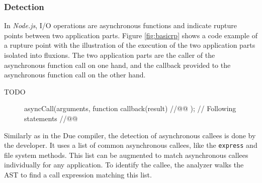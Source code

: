 

\subsubsection{Detection}

In \textit{Node.js}, I/O operations are asynchronous functions and indicate rupture points between two application parts.
Figure \ref{fig:basicrp} shows a code example of a rupture point with the illustration of the execution of the two application parts isolated into fluxions.
The two application parts are the caller of the asynchronous function call on one hand, and the callback provided to the asynchronous function call on the other hand.

TODO

\begin{figure}[h!]%
  \begin{code}
asyncCall(arguments, function callback(result){ //@@ });
// Following statements //@@
  \end{code}%
\end{figure}

Similarly as in the Due compiler, the detection of asynchronous callees is done by the developer. 
It uses a list of common asynchronous callees, like the \texttt{express} and file system methods.
This list can be augmented to match asynchronous callees individually for any application.
To identify the callee, the analyzer walks the AST to find a call expression matching this list.

